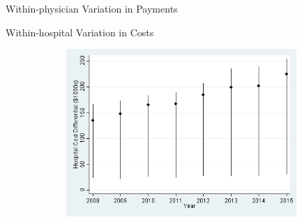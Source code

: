 \documentclass[t]{beamer}
\begin{document}
\begin{frame}{Within-physician Variation in Payments}
\end{frame}

\begin{frame}{Within-hospital Variation in Costs}
    \begin{figure}
        \centering
        \includegraphics[height=2.5in,width=5in,keepaspectratio]{HospSave_Graph_DRG}
    \end{figure}
\end{frame}
\end{document}
